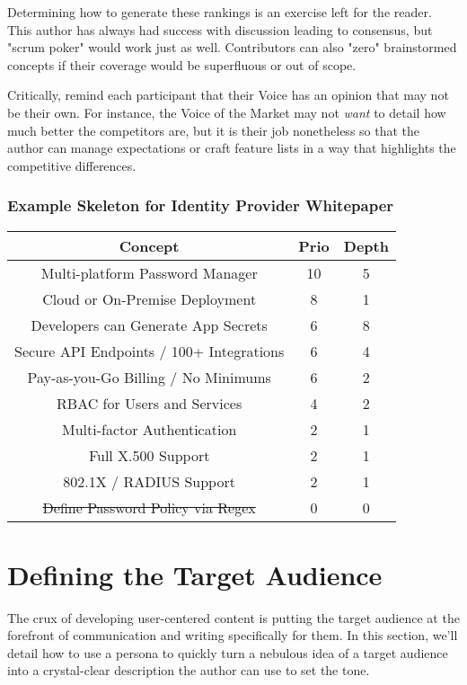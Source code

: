 \documentclass[letterpaper]{article}
\begin{document}
Determining how to generate these rankings is an exercise left for the reader. This author has always had success with discussion leading to consensus, but "scrum poker" would work just as well. Contributors can also "zero" brainstormed concepts if their coverage would be superfluous or out of scope.

Critically, remind each participant that their Voice has an opinion that may not be their own. For instance, the Voice of the Market may not \textit{want} to detail how much better the competitors are, but it is their job nonetheless so that the author can manage expectations or craft feature lists in a way that highlights the competitive differences.

\subsubsection{Example Skeleton for Identity Provider Whitepaper}

\begin{center}
    \begin{tabular}{ *{3}{|c}| } \hline
        \textbf{Concept} & \textbf{Prio} & \textbf{Depth} \\ \hline
        Multi-platform Password Manager & 10 & 5 \\ \hline
        Cloud or On-Premise Deployment & 8 & 1 \\ \hline
        Developers can Generate App Secrets & 6 & 8 \\ \hline
        Secure API Endpoints / 100+ Integrations & 6 & 4 \\ \hline
        Pay-as-you-Go Billing / No Minimums & 6 & 2 \\ \hline
        RBAC for Users and Services & 4 & 2 \\ \hline
        Multi-factor Authentication & 2 & 1 \\ \hline
        Full X.500 Support & 2 & 1 \\ \hline
        802.1X / RADIUS Support & 2 & 1 \\ \hline
        \sout{Define Password Policy via Regex} & 0 & 0 \\ \hline
                
    \end{tabular}
\end{center}

\section{Defining the Target Audience}
The crux of developing user-centered content is putting the target audience at the forefront of communication and writing specifically for them. In this section, we'll detail how to use a persona to quickly turn a nebulous idea of a target audience into a crystal-clear description the author can use to set the tone.
\end{document}
